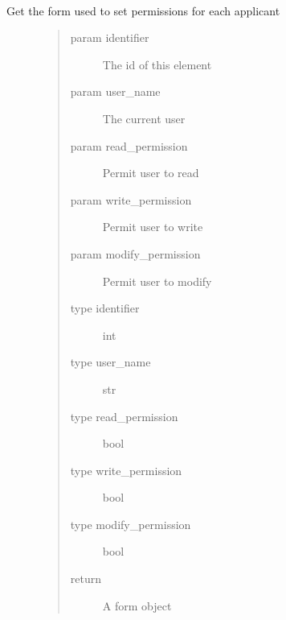 \documentclass[letterpaper,10pt,english]{sphinxmanual}
\begin{document}
\begin{fulllineitems}
\label{\detokenize{index:views.forms.get_apply_permissions_form}}~\begin{description}
\item[{Get the form used to set permissions for each applicant}] \leavevmode\begin{quote}\begin{description}
\item[{param identifier}] \leavevmode
The id of this element

\item[{param user\_name}] \leavevmode
The current user

\item[{param read\_permission}] \leavevmode
Permit user to read

\item[{param write\_permission}] \leavevmode
Permit user to write

\item[{param modify\_permission}] \leavevmode
Permit user to modify

\item[{type identifier}] \leavevmode
int

\item[{type user\_name}] \leavevmode
str

\item[{type read\_permission}] \leavevmode
bool

\item[{type write\_permission}] \leavevmode
bool

\item[{type modify\_permission}] \leavevmode
bool

\item[{return}] \leavevmode
A form object

\end{description}\end{quote}

\end{description}

\end{fulllineitems}
\end{document}

